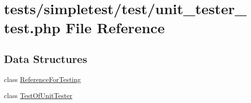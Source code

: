 \hypertarget{unit__tester__test_8php}{\section{tests/simpletest/test/unit\-\_\-tester\-\_\-test.php File Reference}
\label{unit__tester__test_8php}
}
\subsection*{Data Structures}
\begin{DoxyCompactItemize}
\item 
class \hyperlink{class_reference_for_testing}{Reference\-For\-Testing}
\item 
class \hyperlink{class_test_of_unit_tester}{Test\-Of\-Unit\-Tester}
\end{DoxyCompactItemize}
